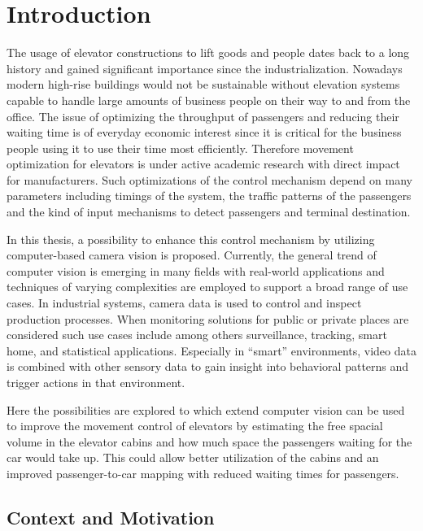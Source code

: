 \chapter{Introduction}
\label{chap:intro}

The usage of elevator constructions to lift goods and people dates back to a long history and gained significant importance since the industrialization.
Nowadays modern high-rise buildings would not be sustainable without elevation systems capable to handle large amounts of business people on their way to and from the office. 
The issue of optimizing the throughput of passengers and reducing their waiting time is of everyday economic interest since it is critical for the business people using it to use their time most efficiently. 
Therefore movement optimization for elevators is under active academic research with direct impact for manufacturers.
Such optimizations of the control mechanism depend on many parameters including timings of the system, the traffic patterns of the passengers and the kind of input mechanisms to detect passengers and terminal destination.

In this thesis, a possibility to enhance this control mechanism by utilizing computer-based camera vision is proposed.
Currently, the general trend of computer vision is emerging in many fields with real-world applications
and techniques of varying complexities are employed to support a broad range of use cases. 
In industrial systems, camera data is used to control and inspect production processes. 
When monitoring solutions for public or private places are considered such use cases include among others surveillance, tracking,
smart home, and statistical applications.
Especially in \enquote{smart} environments, video data is combined with other sensory data to gain insight into behavioral patterns and trigger actions in that environment.

Here the possibilities are explored to which extend
computer vision can be used to improve the movement control of elevators by estimating the free spacial volume in the elevator cabins and how much space the passengers waiting for the car would take up.
This could allow better utilization of the cabins and an improved passenger-to-car mapping with reduced waiting times for passengers.

\section{Context and Motivation}
\label{sec:into:context}

